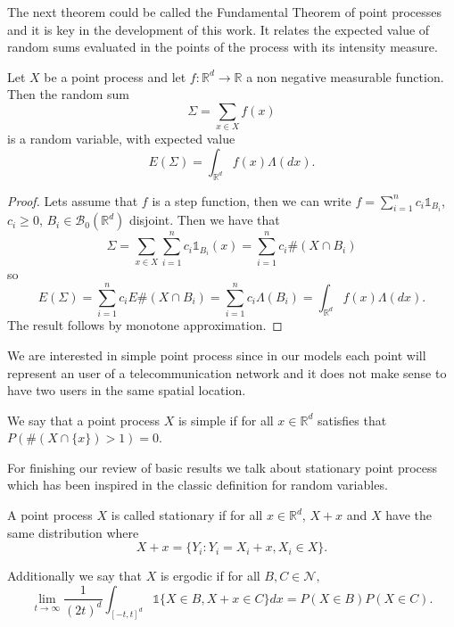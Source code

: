 The next theorem could be called the Fundamental Theorem of point processes and it is key in the development of this work. It relates the expected value of random sums evaluated in the points of the process with its intensity measure. 
\begin{thm}[Campbell] Let $X$ be a point process and let $f:\mathbb{R}^d\rightarrow\mathbb{R}$ a non negative measurable function. Then the random sum $$\Sigma=\sum_{x\in X }f(x) $$ is a random variable, with expected value $$E(\Sigma)=\int_{\mathbb{R}^d}f(x)\Lambda (dx).$$
\end{thm}
\begin{proof}
Lets assume that $f$ is a step function, then we can write $f=\sum_{i=1}^n c_i\mathds{1}_{B_i}$, $c_i\geq 0$, $B_i\in\mathcal{B}_0(\mathbb{R}^d)$ disjoint. Then we have that
$$\Sigma=\sum_{x\in X}\sum_{i=1}^n c_i\mathds{1}_{B_i}(x)=\sum_{i=1}^n c_i \#(X\cap B_i)$$ so
$$E(\Sigma)=\sum_{i=1}^n c_i E\#(X\cap B_i)=\sum_{i=1}^n c_i \Lambda(B_i)=\int_{\mathbb{R}^d}f(x)\Lambda (dx).$$ The result follows by monotone approximation.
\end{proof}

We are interested in simple point process since in our models each point will represent an user of a telecommunication network and it does not make sense to have two users in the same spatial location.

\begin{defn} We say that a point process $X$ is simple if for all $x\in\mathbb{R}^d$ satisfies that $P(\#(X\cap \lbrace x\rbrace)>1)=0$.
\end{defn}



For finishing our review of basic results we talk about stationary point process which has been inspired in the classic definition for random variables.

\begin{defn} A point process $X$ is called stationary if for all $x\in\mathbb{R}^d$, $X+x$ and $X$ have the same distribution where $$ X+x=\lbrace Y_i: Y_i=X_i+x, X_i\in X\rbrace.$$

Additionally we say that $X$ is ergodic if for all $B, C \in\mathcal{N},$ $$\lim_{t\rightarrow\infty}\frac{1}{(2t)^d}\int_{[-t, t]^d}\mathds{1}\lbrace X\in B, X+x\in C\rbrace dx=P(X\in B)P(X\in C).$$
\end{defn}



